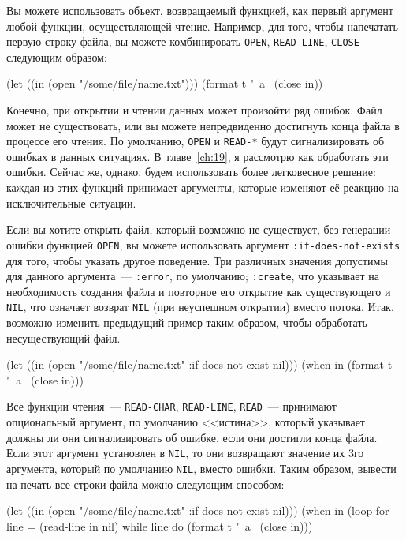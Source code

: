 Вы можете использовать объект, возвращаемый функцией, как первый аргумент любой функции,
осуществляющей чтение. Например, для того, чтобы напечатать первую строку файла, вы можете
комбинировать \lstinline{OPEN}, \lstinline{READ-LINE}, \lstinline{CLOSE} следующим образом:

\begin{myverb}
(let ((in (open "/some/file/name.txt")))
  (format t "~a~%
  (close in))
\end{myverb}

Конечно, при открытии и чтении данных может произойти ряд ошибок. Файл может не
существовать, или вы можете непредвиденно достигнуть конца файла в процессе его чтения. По
умолчанию, \lstinline{OPEN} и \lstinline{READ-*} будут сигнализировать об ошибках в данных
ситуациях. В~главе~\ref{ch:19}, я рассмотрю как обработать эти ошибки. Сейчас же, однако, будем
использовать более легковесное решение: каждая из этих функций принимает аргументы,
которые изменяют её реакцию на исключительные ситуации.

Если вы хотите открыть файл, который возможно не существует, без генерации ошибки
функцией \lstinline{OPEN}, вы можете использовать аргумент \lstinline{:if-does-not-exists} для того,
чтобы указать другое поведение. Три различных значения допустимы для данного аргумента~---
\lstinline{:error}, по умолчанию; \lstinline{:create}, что указывает на необходимость создания файла
и повторное его открытие как существующего и \lstinline{NIL}, что означает возврат \lstinline{NIL}
(при неуспешном открытии) вместо потока. Итак, возможно изменить предыдущий пример таким
образом, чтобы обработать несуществующий файл.

\begin{myverb}
(let ((in (open "/some/file/name.txt" :if-does-not-exist nil)))
  (when in
    (format t "~a~%
    (close in)))
\end{myverb}

Все функции чтения~--- \lstinline{READ-CHAR}, \lstinline{READ-LINE}, \lstinline{READ}~--- принимают
опциональный аргумент, по умолчанию <<истина>>, который указывает должны ли они
сигнализировать об ошибке, если они достигли конца файла. Если этот аргумент установлен в
\lstinline{NIL}, то они возвращают значение их 3го аргумента, который по умолчанию \lstinline{NIL},
вместо ошибки. Таким образом, вывести на печать все строки файла можно следующим способом:

\begin{myverb}
(let ((in (open "/some/file/name.txt" :if-does-not-exist nil)))
  (when in
    (loop for line = (read-line in nil)
         while line do (format t "~a~%
    (close in)))
\end{myverb}


